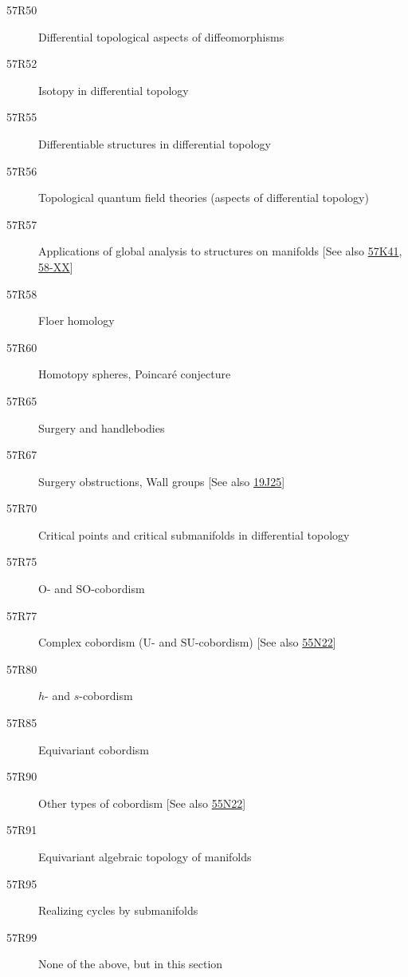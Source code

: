 \begin{description}
\item [57R50]\label{57R50} Differential topological aspects of diffeomorphisms
\item [57R52]\label{57R52} Isotopy in differential topology
\item [57R55]\label{57R55} Differentiable structures in differential topology
\item [57R56]\label{57R56} Topological quantum field theories (aspects of differential topology)
\item [57R57]\label{57R57} Applications of global analysis to structures on manifolds [See also \hyperref[57K41]{57K41}, \hyperref[58-XX]{58-XX}]
\item [57R58]\label{57R58} Floer homology
\item [57R60]\label{57R60} Homotopy spheres, Poincar\'{e} conjecture
\item [57R65]\label{57R65} Surgery and handlebodies
\item [57R67]\label{57R67} Surgery obstructions, Wall groups [See also \hyperref[19J25]{19J25}]
\item [57R70]\label{57R70} Critical points and critical submanifolds in differential topology
\item [57R75]\label{57R75} $\mathrm{O}$- and $\mathrm{SO}$-cobordism
\item [57R77]\label{57R77} Complex cobordism ($\mathrm{U}$- and $\mathrm{SU}$-cobordism) [See also \hyperref[55N22]{55N22}]
\item [57R80]\label{57R80} $h$- and $s$-cobordism
\item [57R85]\label{57R85} Equivariant cobordism
\item [57R90]\label{57R90} Other types of cobordism [See also \hyperref[55N22]{55N22}]
\item [57R91]\label{57R91} Equivariant algebraic topology of manifolds
\item [57R95]\label{57R95} Realizing cycles by submanifolds
\item [57R99]\label{57R99} None of the above, but in this section
\end{description}
